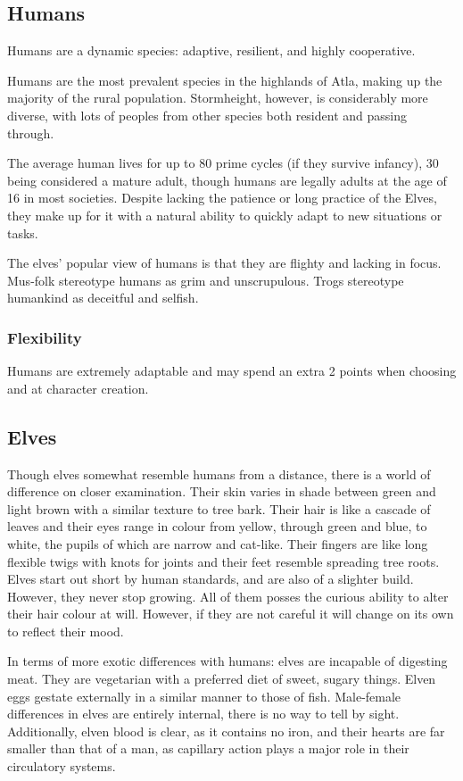 \documentclass[a4paper,11pt,oneside]{book}
\newcommand{\textlf}[1]{\textbf{\titlecap{#1}}}
\begin{document}
\subsection{Humans}
Humans are a dynamic species: adaptive, resilient, and highly cooperative.

Humans are the most prevalent species in the highlands of Atla, making up the majority of the rural population. Stormheight, however, is considerably more diverse, with lots of peoples from other species both resident and passing through.

The average human lives for up to 80 prime cycles (if they survive infancy), 30 being considered a mature adult, though humans are legally adults at the age of 16 in most societies. Despite lacking the patience or long practice of the Elves, they make up for it with a natural ability to quickly adapt to new situations or tasks. 

The elves' popular view of humans is that they are flighty and lacking in focus. Mus-folk stereotype humans as grim and unscrupulous. Trogs stereotype humankind as deceitful and selfish.  

\subsubsection*{Flexibility}
Humans are extremely adaptable and may spend an extra 2 points when choosing \textlf{perks} and \textlf{proficiencies} at character creation.


\subsection{Elves}
Though elves somewhat resemble humans from a distance, there is a world of difference on closer examination. Their skin varies in shade between green and light brown with a similar texture to tree bark. Their hair is like a cascade of leaves and their eyes range in colour from yellow, through green and blue, to white, the pupils of which are narrow and cat-like. Their fingers are like long flexible twigs with knots for joints and their feet resemble spreading tree roots. Elves start out short by human standards, and are also of a slighter build. However, they never stop growing. All of them posses the curious ability to alter their hair colour at will. However, if they are not careful it will change on its own to reflect their mood. 

In terms of more exotic differences with humans: elves are incapable of digesting meat. They are vegetarian with a preferred diet of sweet, sugary things. Elven eggs gestate externally in a similar manner to those of fish. Male-female differences in elves are entirely internal, there is no way to tell by sight. Additionally, elven blood is clear, as it contains no iron, and their hearts are far smaller than that of a man, as capillary action plays a major role in their circulatory systems.
\end{document}
